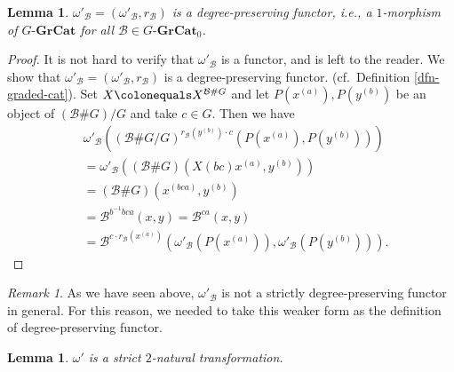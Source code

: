 \documentclass{surv-l}
\numberwithin{equation}{chapter}
\numberwithin{figure}{chapter}
\theoremstyle{plain}
\newtheorem{lem}[thm]{Lemma}
\theoremstyle{definition}
\theoremstyle{remark}
\newtheorem{rmk}[thm]{Remark}
\newcommand{\GGrCat}{G\text{-}\mathbf{GrCat}}
\begin{document}
\begin{lem}
$\omega'_{\mathcal{B}}\!=\!(\omega'_{\mathcal{B}},r_{\mathcal{B}})$
is a degree-preserving functor, i.e.,
a $1$-morphism of $\GGrCat$ for all $\mathcal{B} \in\GGrCat_0$.
\end{lem}

\begin{proof}
It is not hard to verify that $\omega'_\mathcal{B}$ is a functor, and is left to the reader.
We show that
$\omega'_{\mathcal{B}}=(\omega'_{\mathcal{B}},r_{\mathcal{B}})$ is a degree-preserving functor.
(cf.\ Definition \ref{dfn-graded-cat}).
Set $X\colonequals  X^{\mathcal{B}\# G}$ and let
$P(x^{(a)}), P(y^{(b)})$ be an object of $(\mathcal{B} \# G)/G$ and take $c \in G$.
Then we have
\[
\begin{aligned}
&\omega'_\mathcal{B}((\mathcal{B}\# G/G)^{r_\mathcal{B}(y^{(b)})\cdot c}(P(x^{(a)}), P(y^{(b)})))\\
&=\omega'_\mathcal{B}((\mathcal{B}\# G)(X(bc)x^{(a)}, y^{(b)}))\\
&=(\mathcal{B}\# G)(x^{(bca)}, y^{(b)})\\
&=\mathcal{B}^{b^{-1} bca}(x,y)=\mathcal{B}^{ca}(x,y)\\
&=\mathcal{B}^{c\cdot r_\mathcal{B}(x^{(a)})}(\omega'_\mathcal{B}(P(x^{(a)})), \omega'_\mathcal{B}(P(y^{(b)}))).
\end{aligned}
\]
\end{proof}

\begin{rmk}
\label{rmk:necessity-weak}
As we have seen above, $\omega'_\mathcal{B}$ is not a strictly degree-preserving
functor in general.
For this reason, we needed to take this weaker form
as the definition of degree-preserving functor.
\end{rmk}

\begin{lem}\label{lem:om'-strict-2-nat}
$\omega'$ is a strict $2$-natural transformation.
\end{lem}
\end{document}
